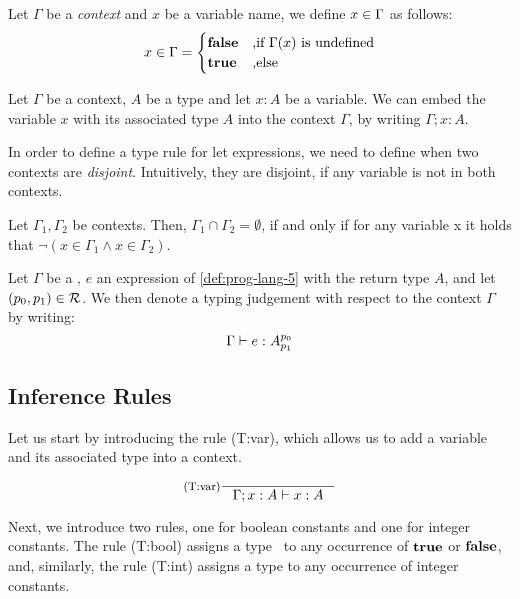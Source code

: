 \begin{definition}\label{def:in-context}
   Let \(\Gamma\) be a \emph{context} and \(x\) be a variable name, we define \(x \in \Gamma\) as follows:
   \[
      x \in \Gamma =
      \begin{cases}
	 \mathbf{false}	     & \text{,if } \Gamma(x) \text{ is undefined}\\
	 \mathbf{true}	     & \text{,else}
      \end{cases}
   \]
\end{definition}

\begin{definition}\label{def:context-augment}
   Let \(\Gamma\) be a context, \(A\) be a type and let \(x : A\) be a variable. We can embed the variable \(x\) with its associated type \(A\) into the context \(\Gamma\),  by writing \(\Gamma ; x:A\).
\end{definition}

In order to define a type rule for let expressions, we need to define when two contexts are \emph{disjoint}. Intuitively, they are disjoint, if any variable is not in both contexts. 

\begin{definition}
   Let \(\Gamma_1, \Gamma_2\) be contexts. Then, \(\Gamma_1 \cap \Gamma_2 = \emptyset\), if and only if for any variable x it holds that \(\neg(x \in \Gamma_1 \wedge x \in \Gamma_2)\).
\end{definition}

\begin{definition}\label{def:type-judgement-context}
   Let \(\Gamma\) be a , \(e\) an expression of \cref{def:prog-lang-5} with the return type \(A\), and let \((p_0, p_1) \in \mathcal{R}\). We then denote a typing judgement with respect to the context \(\Gamma\) by writing:
   \[
      \Gamma \vdash e : A ^{p_0}_{p_1}
   \]
\end{definition}

\subsection{Inference Rules}

Let us start by introducing the rule (T:var), which allows us to add a variable and its associated type into a context.

\[
   \inference[(T:var)]
   {}
   {\typing{\Gamma; x: A}{x}{A}}
\]

Next, we introduce two rules, one for boolean constants and one for integer constants. The rule (T:bool) assigns a type \bool~to any occurrence of \(\mathbf{true}\) or \(\mathbf{false}\), and, similarly, the rule (T:int) assigns a type \typeint to any occurrence of integer constants.


